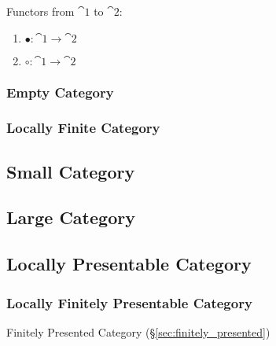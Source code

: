 Functors from $\cat{1}$ to $\cat{2}$:
\begin{enumerate}
  \item $\bullet : \cat{1} \rightarrow \cat{2}$
  \item $\circ : \cat{1} \rightarrow \cat{2}$
\end{enumerate}



\subsubsection{Empty Category}\label{sec:empty_category}

\subsubsection{Locally Finite Category}
\label{sec:locally_finite_category}



\subsection{Small Category}\label{sec:small_category}

\subsection{Large Category}\label{sec:large_category}

\subsection{Locally Presentable Category}\label{sec:locally_presentable}



\subsubsection{Locally Finitely Presentable Category}
\label{sec:lfp_category}

\fist Finitely Presented Category (\S\ref{sec:finitely_presented})

